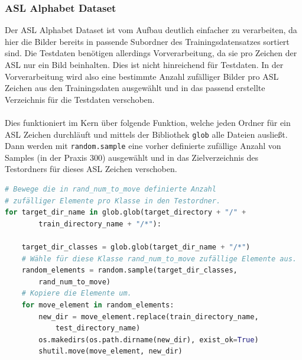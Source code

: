 \documentclass[11pt,bibliography=totocnumbered]{scrartcl}
\begin{document}
\subsubsection{ASL Alphabet Dataset}
\label{aslpreparation}
Der ASL Alphabet Dataset ist vom Aufbau deutlich einfacher zu verarbeiten, da hier die Bilder bereits in passende Subordner des Trainingsdatensatzes sortiert sind. Die Testdaten benötigen allerdings Vorverarbeitung, da sie pro Zeichen der ASL nur ein Bild beinhalten. Dies ist nicht hinreichend für Testdaten. In der Vorverarbeitung wird also eine bestimmte Anzahl zufälliger Bilder pro ASL Zeichen aus den Trainingsdaten ausgewählt und in das passend erstellte Verzeichnis für die Testdaten verschoben.
\\\\
Dies funktioniert im Kern über folgende Funktion, welche jeden Ordner für ein ASL Zeichen durchläuft und mittels der Bibliothek \lstinline[language=pythoninline]|glob| alle Dateien ausließt. Dann werden mit \lstinline[language=pythoninline]|random.sample| eine vorher definierte zufällige Anzahl von Samples (in der Praxis 300) ausgewählt und in das Zielverzeichnis des Testordners für dieses ASL Zeichen verschoben.
\begin{lstlisting}[language=python,firstnumber=44,caption={Kern der Sign Language MNIST Dataset Vorverarbeitung.},label=lst:to_image_at_dir]
# Bewege die in rand_num_to_move definierte Anzahl 
# zufälliger Elemente pro Klasse in den Testordner.
for target_dir_name in glob.glob(target_directory + "/" + 
		train_directory_name + "/*"):
	
	target_dir_classes = glob.glob(target_dir_name + "/*")
	# Wähle für diese Klasse rand_num_to_move zufällige Elemente aus.
	random_elements = random.sample(target_dir_classes, 
		rand_num_to_move)
	# Kopiere die Elemente um.
	for move_element in random_elements:
		new_dir = move_element.replace(train_directory_name, 
			test_directory_name)
		os.makedirs(os.path.dirname(new_dir), exist_ok=True)
		shutil.move(move_element, new_dir)
\end{lstlisting}
\end{document}

